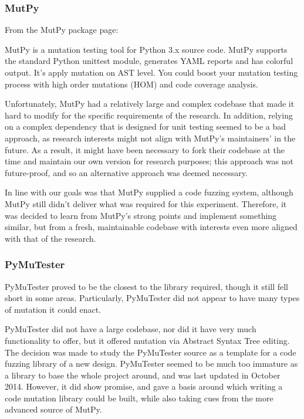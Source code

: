 \documentclass[11pt, twocolumn]{article}
\begin{document}
\subsubsection{MutPy} 
\label{fuzzing_mutpy}
From the MutPy package page\cite{MutPy26:online}: 
\begin{displayquote}
MutPy is a mutation testing tool for Python 3.x source code. MutPy supports the standard Python unittest module, generates YAML reports and has colorful output. It’s apply mutation on AST level. You could boost your mutation testing process with high order mutations (HOM) and code coverage analysis.
\end{displayquote}\par

Unfortunately, MutPy had a relatively large and complex codebase\cite{khala8:online} that made it hard to modify for the specific requirements of the research. In addition, relying on a complex dependency that is designed for unit testing seemed to be a bad approach, as research interests might not align with MutPy's maintainers' in the future. As a result, it might have been necessary to fork their codebase at the time and maintain our own version for research purposes; this approach was not future-proof, and so an alternative approach was deemed necessary. \par

In line with our goals was that MutPy supplied a code fuzzing system, although MutPy still didn't deliver what was required for this experiment. Therefore, it was decided to learn from MutPy's strong points and implement something similar, but from a fresh, maintainable codebase with interests even more aligned with that of the research. \par

\subsubsection{PyMuTester}
\label{fuzzing_pymutester}
PyMuTester\cite{GitHu12:online} proved to be the closest to the library required, though it still fell short in some areas. Particularly, PyMuTester did not appear to have many types of mutation it could enact. \par

PyMuTester did not have a large codebase\cite{GitHu12:online}, nor did it have very much functionality to offer, but it offered mutation via Abstract Syntax Tree editing. The decision was made to study the PyMuTester source as a template for a code fuzzing library of a new design. PyMuTester seemed to be much too immature as a library to base the whole project around, and was last updated in October 2014. However, it did show promise, and gave a basis around which writing a code mutation library could be built, while also taking cues from the more advanced source of MutPy\cite{khala8:online}. \par
\end{document}

